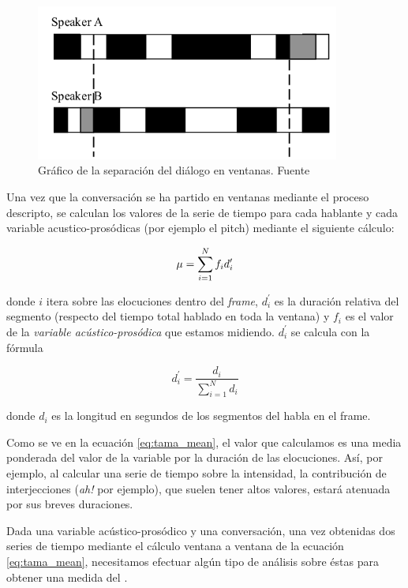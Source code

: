 \begin{figure}
\centering
\includegraphics[width=10cm]{images/tama.png}
\caption{Gráfico de la separación del diálogo en ventanas. Fuente \cite{KOU2008}}

\label{tama}
\end{figure}

Una vez que la conversación se ha partido en ventanas mediante el proceso descripto, se calculan los valores de la serie de tiempo para cada hablante y cada variable acustico-prosódicas (por ejemplo el pitch) mediante el siguiente cálculo:

\begin{equation}
    \mu = \sum\limits_{i=1}^N f_i d_i^\prime \label{eq:tama_mean}\\
\end{equation}

\noindent donde $i$ itera sobre las elocuciones dentro del \emph{frame}, $d_i^\prime$ es la duración relativa del segmento (respecto del tiempo total hablado en toda la ventana) y $f_i$ es el valor de la \emph{variable acústico-prosódica} que estamos midiendo. $d_i^\prime$ se calcula con la fórmula

\begin{equation}
d_i^\prime = \frac{d_i}{\sum\limits_{i=1}^N d_i}
\end{equation}

\noindent donde $d_i$ es la longitud en segundos de los segmentos del habla en el frame.

Como se ve en la ecuación \ref{eq:tama_mean}, el valor que calculamos es una media ponderada del valor de la variable por la duración de las elocuciones. Así, por ejemplo, al calcular una serie de tiempo sobre la intensidad, la contribución de interjecciones (\emph{ah!} por ejemplo), que suelen tener altos valores, estará atenuada por sus breves duraciones.

Dada una variable acústico-prosódico y una conversación, una vez obtenidas  dos series de tiempo mediante el cálculo ventana a ventana de la ecuación \ref{eq:tama_mean}, necesitamos efectuar algún tipo de análisis sobre éstas para obtener una medida del \entrainment.
